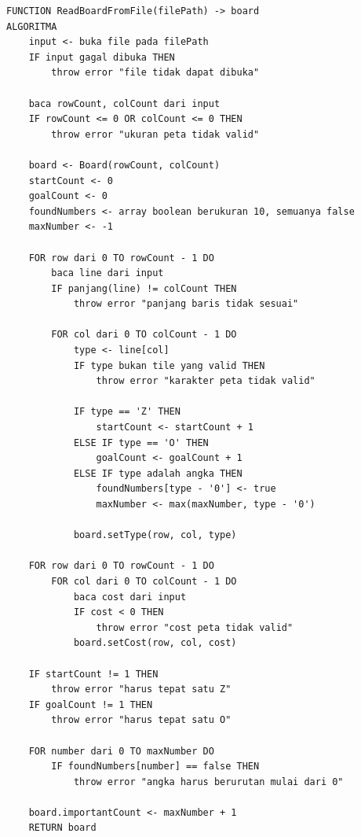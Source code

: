 \documentclass[a4paper,11pt]{article}
\begin{document}
\begin{lstlisting}[language=Pseudocode, caption=Pseudocode Pembacaan dan Validasi Board, label={lst:readboard}]
FUNCTION ReadBoardFromFile(filePath) -> board
ALGORITMA
    input <- buka file pada filePath
    IF input gagal dibuka THEN
        throw error "file tidak dapat dibuka"

    baca rowCount, colCount dari input
    IF rowCount <= 0 OR colCount <= 0 THEN
        throw error "ukuran peta tidak valid"

    board <- Board(rowCount, colCount)
    startCount <- 0
    goalCount <- 0
    foundNumbers <- array boolean berukuran 10, semuanya false
    maxNumber <- -1

    FOR row dari 0 TO rowCount - 1 DO
        baca line dari input
        IF panjang(line) != colCount THEN
            throw error "panjang baris tidak sesuai"

        FOR col dari 0 TO colCount - 1 DO
            type <- line[col]
            IF type bukan tile yang valid THEN
                throw error "karakter peta tidak valid"

            IF type == 'Z' THEN
                startCount <- startCount + 1
            ELSE IF type == 'O' THEN
                goalCount <- goalCount + 1
            ELSE IF type adalah angka THEN
                foundNumbers[type - '0'] <- true
                maxNumber <- max(maxNumber, type - '0')

            board.setType(row, col, type)

    FOR row dari 0 TO rowCount - 1 DO
        FOR col dari 0 TO colCount - 1 DO
            baca cost dari input
            IF cost < 0 THEN
                throw error "cost peta tidak valid"
            board.setCost(row, col, cost)

    IF startCount != 1 THEN
        throw error "harus tepat satu Z"
    IF goalCount != 1 THEN
        throw error "harus tepat satu O"

    FOR number dari 0 TO maxNumber DO
        IF foundNumbers[number] == false THEN
            throw error "angka harus berurutan mulai dari 0"

    board.importantCount <- maxNumber + 1
    RETURN board
\end{lstlisting}
\end{document}
